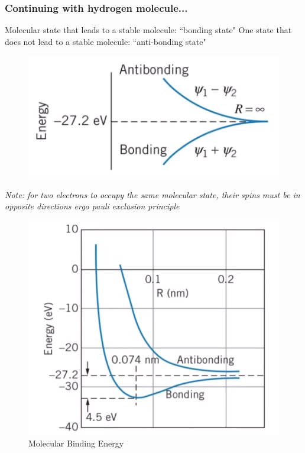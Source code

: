 \documentclass[class=article,crop=false]{standalone}
\begin{document}
\subsubsection{Continuing with hydrogen molecule...}
Molecular state that leads to a stable molecule: ``bonding state"
One state that does not lead to a stable molecule: ``anti-bonding state"

\begin{figure}[h!]
	\centering
	\includegraphics[width=.9\linewidth]{./Images/antibonding.png}
	\caption{}
\end{figure}

\emph{Note: for two electrons to occupy the same molecular state, their spins must be in opposite directions ergo pauli exclusion principle}

\begin{figure}[h!]
	\centering
	\includegraphics[width=.9\linewidth]{./Images/binding_energy.png}
	\caption{Molecular Binding Energy}
\end{figure}
\end{document}
